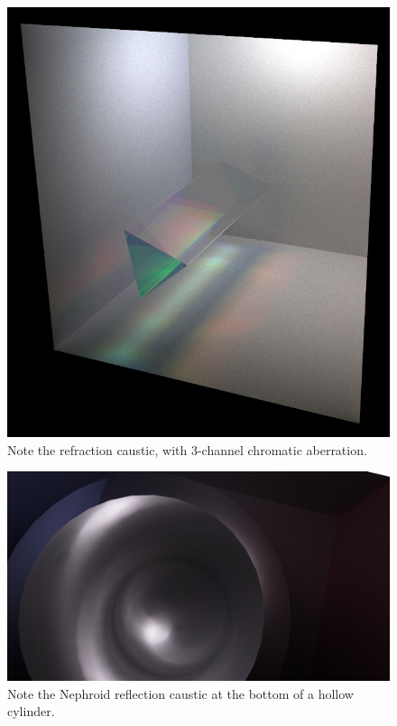 \documentclass[12pt]{article}
\begin{document}
\begin{figure} 
\centering
  \includegraphics[width = 6 in]{v_rt_reflect_prism.png}
  \caption{ Note the refraction caustic, with 3-channel chromatic aberration.
}
\end{figure}


\begin{figure} 
\centering
  \includegraphics[width = 6 in]{v_rt_reflection_caustic2.png}
  \caption{ Note the Nephroid reflection caustic at the bottom of a hollow cylinder.
}
\end{figure}
\end{document}
